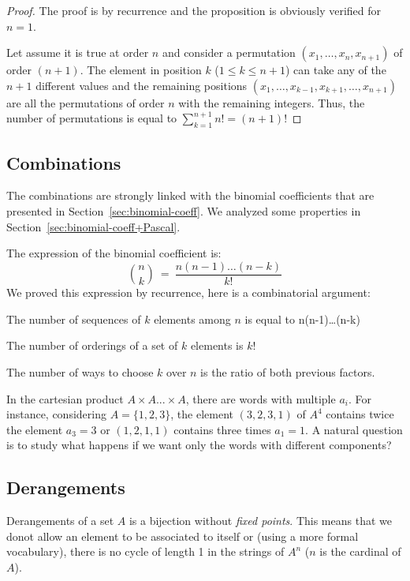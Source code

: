 \begin{proof}
The proof is by recurrence and the proposition is obviously verified for $n=1$.

Let assume it is true at order $n$ and consider a permutation $(x_1, \ldots , x_n, x_{n+1})$ of order $(n+1)$.
The element in position $k$ ($1 \leq k \leq n+1$) can take any of the $n+1$ different values
and the remaining positions $(x_1, \ldots , x_{k-1}, x_{k+1}, \ldots, x_{n+1})$
are all the permutations of order $n$ with the remaining integers.
Thus, the number of permutations is equal to $\sum_{k=1}^{n+1} n! = (n+1)!$
\end{proof}



\subsection{Combinations}

The combinations are strongly linked with the binomial coefficients that are presented 
in Section~\ref{sec:binomial-coeff}.
We analyzed some properties in Section~\ref{sec:binomial-coeff+Pascal}.

The expression of the binomial coefficient is:
\[ {n \choose k} \ = \ \frac{n(n-1)\ldots(n-k)}{k!} \]
We proved this expression by recurrence, here is a combinatorial argument:

The number of sequences of $k$ elements among $n$ is equal to n(n-1)\ldots(n-k)

The number of orderings of a set of $k$ elements is $k!$

The number of ways to choose $k$ over $n$ is the ratio of both previous factors.

\medskip

In the cartesian product  $A \times A ... \times A$, there are words with multiple $a_i$.
For instance, considering $A=\{ 1,2,3 \}$, the element $(3,2,3,1)$ of $A^4$ contains twice the element $a_3=3$ 
or $(1,2,1,1)$ contains three times $a_1=1$. 
A natural question is to study what happens if we want only the words with different components?


\subsection{Derangements}

Derangements of a set $A$ is a bijection without \textit{fixed points}.
This means that we donot allow an element to be associated to itself
or (using a more formal vocabulary), there is no cycle of length 1 in the strings of $A^n$
($n$ is the cardinal of $A$).

